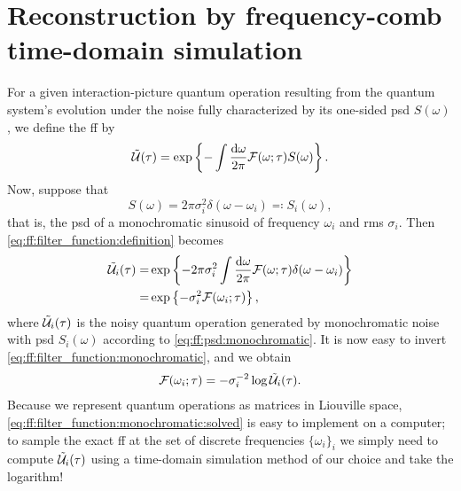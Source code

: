 \chapter{Reconstruction by frequency-comb time-domain simulation}\label{ch:ff:validation}
For a {\color{RWTHmagenta75} given} interaction-picture quantum operation \liouvUe resulting from the quantum system's evolution under the noise fully characterized by its one-sided \gls{psd} $S(\omega)$, we define the \gls{ff} \FF by
\begin{align}
    \label{eq:ff:filter_function:definition}
    \mathcal{\tilde{U}}(\tau) = \exp\left\{-\int\frac{\dd{\omega}}{2\pi}\mathcal{F}(\omega;\tau) S(\omega)\right\}.
\end{align}
Now, suppose that
\begin{equation}
    \label{eq:ff:psd:monochromatic}
    S(\omega) = 2\pi\sigma_i^2 \delta(\omega - \omega_i) \eqqcolon S_i(\omega),
\end{equation}
that is, the \gls{psd} of a monochromatic sinusoid of frequency $\omega_i$ and \gls{rms} $\sigma_i$.
Then \cref{eq:ff:filter_function:definition} becomes
\begin{equation}
    \label{eq:ff:filter_function:monochromatic}
    \begin{split}
        \mathcal{\tilde{U}}_i(\tau) =& \exp\left\lbrace -2\pi\sigma_i^2\int\frac{\dd{\omega}}{2\pi}\mathcal{F}(\omega;\tau)\delta(\omega - \omega_i)\right\rbrace \\
                                  =& \exp\left\lbrace -\sigma_i^2\mathcal{F}(\omega_i;\tau)\right\rbrace,
    \end{split}
\end{equation}
where $\mathcal{\tilde{U}}_i(\tau)$ is the noisy quantum operation generated by monochromatic noise with \gls{psd} $S_i(\omega)$ according to \cref{eq:ff:psd:monochromatic}.
It is now easy to invert \cref{eq:ff:filter_function:monochromatic}, and we obtain
\begin{align}
    \label{eq:ff:filter_function:monochromatic:solved}
    \mathcal{F}(\omega_i; \tau) = -\sigma_i^{-2}\log\mathcal{\tilde{U}}_i(\tau).
\end{align}
Because we represent quantum operations as matrices in Liouville space, \cref{eq:ff:filter_function:monochromatic:solved} is easy to implement on a computer; to sample the exact \gls{ff} at the set of discrete frequencies $\lbrace\omega_i\rbrace_i$ we simply need to compute $\mathcal{\tilde{U}}_i(\tau)$  using a time-domain simulation method of our choice and take the logarithm!

